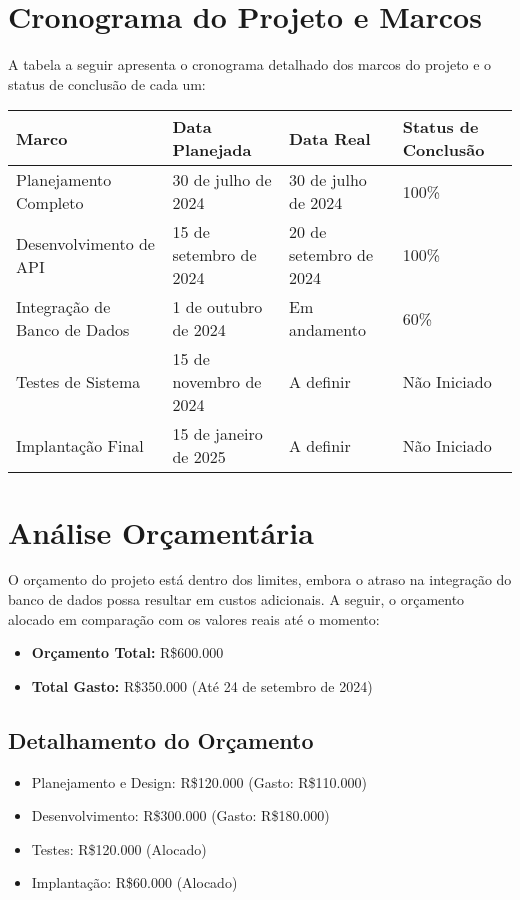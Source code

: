\documentclass[12pt]{article}
\begin{document}
\section*{Cronograma do Projeto e Marcos}
A tabela a seguir apresenta o cronograma detalhado dos marcos do projeto e o status de conclusão de cada um:

\begin{center}
\begin{tabular}{|m{4cm}|m{3cm}|m{3cm}|m{3cm}|}
\hline
\textbf{Marco} & \textbf{Data Planejada} & \textbf{Data Real} & \textbf{Status de Conclusão} \\
\hline
Planejamento Completo & 30 de julho de 2024 & 30 de julho de 2024 & 100\% \\
\hline
Desenvolvimento de API & 15 de setembro de 2024 & 20 de setembro de 2024 & 100\% \\
\hline
Integração de Banco de Dados & 1 de outubro de 2024 & Em andamento & 60\% \\
\hline
Testes de Sistema & 15 de novembro de 2024 & A definir & Não Iniciado \\
\hline
Implantação Final & 15 de janeiro de 2025 & A definir & Não Iniciado \\
\hline
\end{tabular}
\end{center}

\section*{Análise Orçamentária}
O orçamento do projeto está dentro dos limites, embora o atraso na integração do banco de dados possa resultar em custos adicionais. A seguir, o orçamento alocado em comparação com os valores reais até o momento:

\begin{itemize}
    \item \textbf{Orçamento Total:} R\$600.000
    \item \textbf{Total Gasto:} R\$350.000 (Até 24 de setembro de 2024)
\end{itemize}

\subsection*{Detalhamento do Orçamento}
\begin{itemize}
    \item Planejamento e Design: R\$120.000 (Gasto: R\$110.000)
    \item Desenvolvimento: R\$300.000 (Gasto: R\$180.000)
    \item Testes: R\$120.000 (Alocado)
    \item Implantação: R\$60.000 (Alocado)
\end{itemize}
\end{document}
